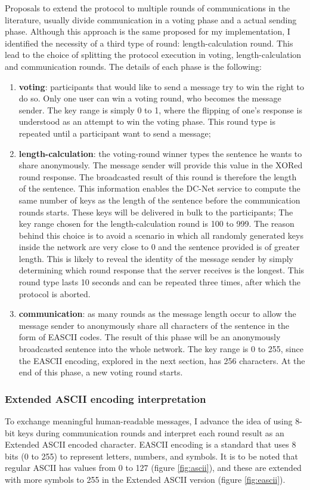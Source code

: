 Proposals to extend the protocol to multiple rounds of communications in the literature, usually divide communication in a voting phase and a actual sending phase. Although this approach is the same proposed for my implementation, I identified the necessity of a third type of round: length-calculation round. This lead to the choice of splitting the protocol execution in voting, length-calculation and communication rounds. 
The details of each phase is the following:
\begin{enumerate}
    \item \textbf{voting}: participants that would like to send a message try to win the right to do so. Only one user can win a voting round, who becomes the message sender. The key range is simply 0 to 1, where the flipping of one's response is understood as an attempt to win the voting phase. This round type is repeated until a participant want to send a message;
    \item \textbf{length-calculation}: the voting-round winner types the sentence he wants to share anonymously. The message sender will provide this value in the XORed round response. The broadcasted result of this round is therefore the length of the sentence. This information enables the DC-Net service to compute the same number of keys as the length of the sentence before the communication rounds starts. These keys will be delivered in bulk to the participants; The key range chosen for the length-calculation round is 100 to 999. The reason behind this choice is to avoid a scenario in which all randomly generated keys inside the network are very close to 0 and the sentence provided is of greater length. This is likely to reveal the identity of the message sender by simply determining which round response that the server receives is the longest. This round type lasts 10 seconds and can be repeated three times, after which the protocol is aborted.
    \item \textbf{communication}: as many rounds as the message length occur to allow the message sender to anonymously share all characters of the sentence in the form of EASCII codes. The result of this phase will be an anonymously broadcasted sentence into the whole network. The key range is 0 to 255, since the EASCII encoding, explored in the next section, has 256 characters. At the end of this phase, a new voting round starts.
\end{enumerate}


\subsubsection{Extended ASCII encoding interpretation}
To exchange meaningful human-readable messages, I advance the idea of using 8-bit keys during communication rounds and interpret each round result as an Extended ASCII encoded character. 
EASCII encoding is a standard that uses 8 bits (0 to 255) to represent letters, numbers, and symbols.  It is to be noted that regular ASCII has values from 0 to 127 (figure \ref{fig:ascii}), and these are extended with more symbols to 255 in the Extended ASCII version (figure \ref{fig:eascii}). 

